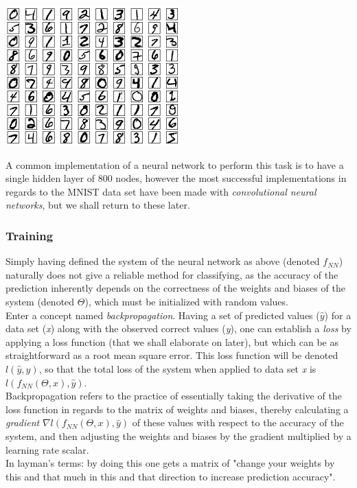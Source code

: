 \begin{multicols}{2}
\begin{Figure}
 \centering
 \includegraphics[width=0.7\linewidth]{images/mnist}
 \captionsetup{width=0.8\linewidth, font=small}
\end{Figure}

\noindent A common implementation of a neural network to perform this task is to have a single hidden layer of 800 nodes, however the most successful implementations in regards to the MNIST data set have been made with \textit{convolutional neural networks}, but we shall return to these later.

\subsubsection{Training}
Simply having defined the system of the neural network as above (denoted $f_{NN}$) naturally does not give a reliable method for classifying, as the accuracy of the prediction inherently depends on the correctness of the weights and biases of the system (denoted $\Theta$), which must be initialized with random values. \\
Enter a concept named \textit{backpropagation}. Having a set of predicted values ($\hat{y}$) for a data set (\textit{x}) along with the observed correct values (\textit{y}), one can establish a \textit{loss} by applying a loss function (that we shall elaborate on later), but which can be as straightforward as a root mean square error. This loss function will be denoted $l(\hat{y},y)$, so that the total loss of the system when applied to data set \textit{x} is $l(f_{NN}(\Theta, x), \hat{y})$. \citep[p. 241]{bishop-2006}\\
Backpropagation refers to the practice of essentially taking the derivative of the loss function in regards to the matrix of weights and biases, thereby calculating a \textit{gradient} $\nabla{l(f_{NN}(\Theta, x), \hat{y})}$ of these values with respect to the accuracy of the system, and then adjusting the weights and biases by the gradient multiplied by a learning rate scalar.\\
In layman's terms: by doing this one gets a matrix of "change your weights by this and that much in this and that direction to increase prediction accuracy".



\end{multicols}
